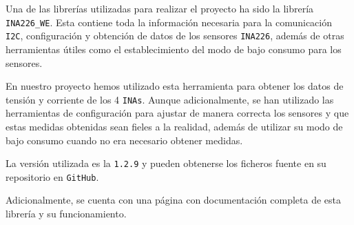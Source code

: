 Una de las librerías utilizadas para realizar el proyecto ha sido la librería \texttt{INA226\_WE}.  Esta contiene toda la información necesaria para la comunicación \texttt{I2C}, configuración y obtención de datos de los sensores \texttt{INA226}, además de otras herramientas útiles como el establecimiento del modo de bajo consumo para los sensores.

En nuestro proyecto hemos utilizado esta herramienta para obtener los datos de tensión y corriente de los 4 \texttt{INAs}.  Aunque adicionalmente, se han utilizado las herramientas de configuración para ajustar de manera correcta los sensores y que estas medidas obtenidas sean fieles a la realidad, además de utilizar su modo de bajo consumo cuando no era necesario obtener medidas.

La versión utilizada es la \texttt{1.2.9} y pueden obtenerse los ficheros fuente en su repositorio en \texttt{GitHub}. \cite{ewaldWollewaldINA226_WE2024}

Adicionalmente, se cuenta con una página con documentación completa de esta librería y su funcionamiento. \cite{ewaldINA226CurrentPower2021}